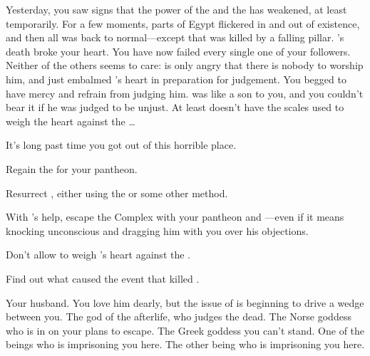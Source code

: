 \documentclass[char]{guardians}
\begin{document}
Yesterday, you saw signs that the power of the \cWarden{} and the \cCaretaker{} has weakened, at least temporarily. For a few moments, parts of Egypt flickered in and out of existence, and then all was back to normal---except that \cEgyptianHuman{} was killed by a falling pillar. \cEgyptianHuman{}'s death broke your heart. You have now failed every single one of your followers. Neither of the others seems to care: \cOsiris{} is only angry that there is nobody to worship him, and \cAnubis{} just embalmed \cEgyptianHuman{}'s heart in preparation for judgement. You begged \cAnubis{} to have mercy and refrain from judging him. \cEgyptianHuman{} was like a son to you, and you couldn't bear it if he was judged to be unjust. At least \cAnubis{} doesn't have the scales used to weigh the heart against the \iFeather{\MYname}\ldots{}

It's long past time you got out of this horrible place.

\begin{itemz}[Goals]
  \item Regain the \iNecro{} for your pantheon.
  \item Resurrect \cSet{}, either using the \iNecro{\MYname} or some other method.
  \item With \cSet{}'s help, escape the Complex with your pantheon and \cHel{}---even if it means knocking \cOsiris{} unconscious and dragging him with you over his objections.
  \item Don't allow \cAnubis{} to weigh \cEgyptianHuman{}'s heart against the \iFeather{\MYname}.
  \item Find out what caused the event that killed \cEgyptianHuman{}.
\end{itemz}

\begin{contacts}
  \contact{\cOsiris{}} Your husband. You love him dearly, but the issue of \cSet{} is beginning to drive a wedge between you.
  \contact{\cAnubis{}} The god of the afterlife, who judges the dead.
  \contact{\cHel{}} The Norse goddess who is in on your plans to escape.
  \contact{\cHera{}} The Greek goddess you can't stand.
   One of the beings who is imprisoning you here.
   The other being who is imprisoning you here.
\end{contacts}
\end{document}
